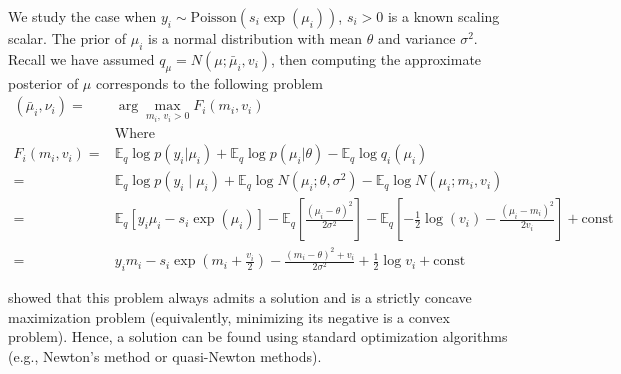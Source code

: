  

We study the case when $y_i \sim \text{Poisson}(s_i \exp(\mu_{i }))$, $s_i > 0$ is a known scaling scalar. The prior of $\mu_{i }$ is a normal distribution with mean $\theta$ and variance $\sigma^2$. Recall we have assumed $q_{\mu} = N(\mu; \bar{\mu}_{i}, v_{i})$, then computing the approximate posterior of $\mu$ corresponds to the following   problem
\begin{align}
    (\bar{\mu}_{i}, \nu_i)  =& \arg\max_{m_i,\,v_i>0} F_i(m_i, v_i)\\
    &\text{Where}\\
F_i(m_i, v_i)=&   \mathbb{E}_q \log p(y_{i}| \mu_{i})+ \mathbb{E}_q \log p(\mu_{i}|\theta)- \mathbb{E}_q \log q_{i}(\mu_i) \\
=&  \mathbb{E}_q\log p(y_{i}\mid \mu_{i}) + \mathbb{E}_q \log N(\mu_{i}; \theta, \sigma^2) - \mathbb{E}_q \log N(\mu_{i}; m_i, v_i)\\
=&  \mathbb{E}_q \left[y_{i}\mu_{i} - s_i\exp(\mu_i) \right] - \mathbb{E}_q  \left[\frac{(\mu_{i}- \theta)^2}{2 \sigma^2} \right]- \mathbb{E}_q\left[ -\frac{1}{2}\log(v_i) - \frac{(\mu_{i}- m_i)^2}{2 v_i} \right]+\mathrm{const}\\
=& y_{i}m_i-s_i\exp\left(m_i+\frac{v_i}{2}\right)-\frac{(m_i-\theta)^2+v_i}{2\sigma^2}+\frac{1}{2}\log v_i+\mathrm{const} \label{eq:Poisson_elbo}
\end{align}



 \cite{xie_empirical_2023} showed that this problem always admits a solution and is a strictly concave maximization problem (equivalently, minimizing its negative is a convex problem). Hence, a solution can be found using standard optimization algorithms (e.g., Newton's method or quasi-Newton methods).
 








